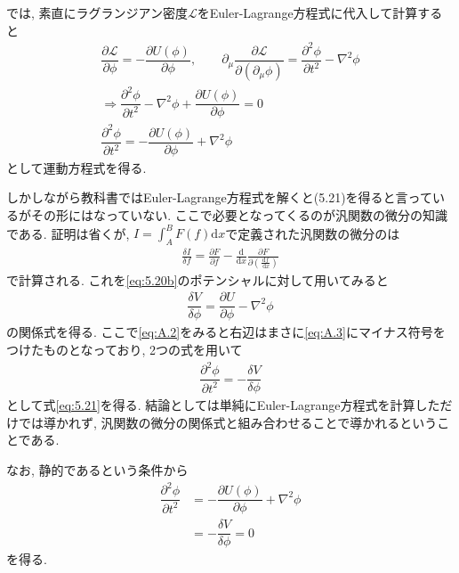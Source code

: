 \documentclass[dvipdfmx,11pt,a4paper,oneside,openany]{jsbook}
\begin{document}
では, 素直にラグランジアン密度$\mathcal{L}$をEuler-Lagrange方程式に代入して計算すると
\begin{align}
    \dfrac{\partial \mathcal{L}}{\partial \phi}=-\dfrac{\partial U(\phi)}{\partial\phi},\qquad \partial_\mu\dfrac{\partial\mathcal{L}}{\partial(\partial_\mu\phi)}=\dfrac{\partial^2 \phi}{\partial t^2}-\nabla^2\phi\nonumber \\
    \Rightarrow \dfrac{\partial^2 \phi}{\partial t^2}-\nabla^2\phi+\dfrac{\partial U(\phi)}{\partial \phi}=0\nonumber                                                                                                          \\
    \dfrac{\partial^2 \phi}{\partial t^2}=-\dfrac{\partial U(\phi)}{\partial \phi}+\nabla^2\phi\tag{A.2}\label{eq:A.2}
\end{align}
として運動方程式を得る.

しかしながら教科書ではEuler-Lagrange方程式を解くと(5.21)を得ると言っているがその形にはなっていない. ここで必要となってくるのが汎関数の微分の知識である. 証明は省くが, $I=\int_{A}^{B} F(f) \mathrm{d} x$で定義された汎関数の微分のは
\begin{align*}
    \frac{\delta I}{\delta f}=\frac{\partial F}{\partial f}-\frac{\mathrm{d}}{\mathrm{d} x} \frac{\partial F}{\partial\left(\frac{\mathrm{d} f}{\mathrm{~d} x}\right)}
\end{align*}
で計算される. これを\eqref{eq:5.20b}のポテンシャルに対して用いてみると
\begin{align}
    \dfrac{\delta V}{\delta \phi}=\dfrac{\partial U}{\partial \phi}-\nabla^2\phi\tag{A.3}\label{eq:A.3}
\end{align}
の関係式を得る. ここで\eqref{eq:A.2}をみると右辺はまさに\eqref{eq:A.3}にマイナス符号をつけたものとなっており, 2つの式を用いて
\begin{align}
    \dfrac{\partial^2 \phi}{\partial t^2}=-\dfrac{\delta V}{\delta \phi
    }\label{eq:5.21}
\end{align}
として式\eqref{eq:5.21}を得る. 結論としては単純にEuler-Lagrange方程式を計算しただけでは導かれず, 汎関数の微分の関係式と組み合わせることで導かれるということである.

なお, 静的であるという条件から
\begin{align}
    \dfrac{\partial^2 \phi}{\partial t^2} & =-\dfrac{\partial U(\phi)}{\partial \phi}+\nabla^2\phi\nonumber \\
                                          & =-\dfrac{\delta V}{\delta \phi
    }=0\label{eq:5.22}
\end{align}
を得る.
\end{document}
